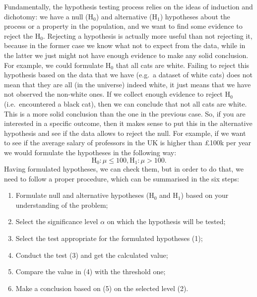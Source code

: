 \documentclass[
]{book}
\providecommand{\tightlist}{%
  \setlength{\itemsep}{0pt}\setlength{\parskip}{0pt}}
\theoremstyle{definition}
\theoremstyle{definition}
\theoremstyle{definition}
\theoremstyle{definition}
\theoremstyle{remark}
\begin{document}
Fundamentally, the hypothesis testing process relies on the ideas of induction and dichotomy: we have a null (\(\mathrm{H}_0\)) and alternative (\(\mathrm{H}_1\)) hypotheses about the process or a property in the population, and we want to find some evidence to reject the \(\mathrm{H}_0\). Rejecting a hypothesis is actually more useful than not rejecting it, because in the former case we know what not to expect from the data, while in the latter we just might not have enough evidence to make any solid conclusion. For example, we could formulate \(\mathrm{H}_0\) that all cats are white. Failing to reject this hypothesis based on the data that we have (e.g.~a dataset of white cats) does not mean that they are all (in the universe) indeed white, it just means that we have not observed the non-white ones. If we collect enough evidence to reject \(\mathrm{H}_0\) (i.e.~encountered a black cat), then we can conclude that not all cats are white. This is a more solid conclusion than the one in the previous case. So, if you are interested in a specific outcome, then it makes sense to put this in the alternative hypothesis and see if the data allows to reject the null. For example, if we want to see if the average salary of professors in the UK is higher than £100k per year we would formulate the hypotheses in the following way:
\begin{equation*}
    \mathrm{H}_0: \mu \leq 100, \mathrm{H}_1: \mu > 100.
\end{equation*}
Having formulated hypotheses, we can check them, but in order to do that, we need to follow a proper procedure, which can be summarised in the six steps:

\begin{enumerate}
\def\labelenumi{\arabic{enumi}.}
\tightlist
\item
  Formulate null and alternative hypotheses (\(\mathrm{H}_0\) and \(\mathrm{H}_1\)) based on your understanding of the problem;
\item
  Select the significance level \(\alpha\) on which the hypothesis will be tested;
\item
  Select the test appropriate for the formulated hypotheses (1);
\item
  Conduct the test (3) and get the calculated value;
\item
  Compare the value in (4) with the threshold one;
\item
  Make a conclusion based on (5) on the selected level (2).
\end{enumerate}
\end{document}
